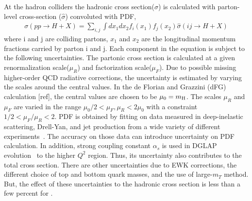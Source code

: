 At the hadron colliders the hadronic cross section($\sigma$) is calculated with 
parton-level cross-section ($\hat{\sigma}$) convoluted with PDF, 
\begin{eqnarray} 
\sigma (pp \rightarrow H+X) 
= 
\sum_{i,j} \int dx_1 dx_2 f_i(x_1) f_j(x_2) 
\hat{\sigma} \left( ij \rightarrow H+X \right)
\end{eqnarray} 
where i and j are colliding partons, 
$x_1$ and $x_2$ are the longitudinal momentum fractions carried by parton i and j. 
Each component in the equation is subject to the following uncertainties.
The partonic cross section is calculated at a given
renormalization scale($\mu_R$) and factorization scale($\mu_F$). 
Due to possible missing higher-order QCD radiative corrections,
the uncertainty is estimated by varying the scales around 
the central values. In the de Florian and Grazzini (dFG) 
calculation [ref], the central values are chosen to be $\mu_0 = m_{\mathrm{H}}$. 
The scales $\mu_R$ and $\mu_F$ are varied in the range 
$\mu_0/2 < \mu_F, \mu_R < 2\mu_0$ 
with a constraint $1/2 < \mu_F/\mu_R < 2$. 
PDF is obtained by fitting on data measured in deep-inelastic scattering, 
Drell-Yan, and jet production from a wide variety of different experiments~\cite{}. 
The accuracy on those data can introduce uncertainty on PDF calculation. 
In addition, strong coupling constant $\alpha_s$ is used in DGLAP evolution~\cite{x} 
to the higher $Q^2$ region. Thus, its uncertainty also contributes to 
the total cross section. There are other uncertainties due to 
EWK corrections, the different choice of top and bottom quark masses, 
and the use of large-$m_T$ method. But, the effect of these uncertainties to the 
hadronic cross section is less than a few percent \cite{Dittmaier:2012vm}
for \ggH.

